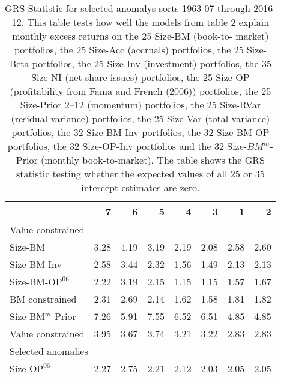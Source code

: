 
\begin{table}[!ht]
\centering
\caption{
\scriptsize{
GRS Statistic for selected anomalys sorts 1963-07 through 2016-12. This table tests how
well the models from table 2 explain monthly excess returns on the 25 Size-BM (book-to-
market) portfolios, the 25 Size-Acc (accruals) portfolios, the 25 Size-Beta portfolios,
the 25 Size-Inv (investment) portfolios, the 35 Size-NI (net share issues) portfolios, the
25 Size-OP (profitability from Fama and French (2006)) portfolios, the 25 Size-Prior 2–12
(momentum) portfolios, the 25 Size-RVar (residual variance) portfolios, the 25 Size-Var
(total variance) portfolios, the 32 Size-BM-Inv portfolios, the 32 Size-BM-OP portfolios,
the 32 Size-OP-Inv portfolios and the 32 Size-$BM^m$-Prior (monthly book-to-market). The
table shows the GRS statistic testing whether the expected values of all 25 or 35
intercept estimates are zero.
}
}
\begin{tabular}{lrrrrrrr}
  \toprule
     & 7 & 6  & 5  & 4  & 3  & 1  & 2  \\
  \midrule
  
    \multicolumn{8}{l}{Value constrained} \\
    
    Size-BM  & 3.28  & 4.19  & 3.19  & 2.19  & 2.08  & 2.58  & 2.60  \\
    
  
    
    
    Size-BM-Inv  & 2.58  & 3.44  & 2.32  & 1.56  & 1.49  & 2.13  & 2.13  \\
    
  
    
    
    Size-BM-$\text{OP}^{06}$  & 2.22  & 3.19  & 2.15  & 1.15  & 1.15  & 1.57  & 1.67  \\
    
  
    
    
    BM constrained  & 2.31  & 2.69  & 2.14  & 1.62  & 1.58  & 1.81  & 1.82  \\
    [1em]
  
    
    
    Size-$\text{BM}^m$-Prior  & 7.26  & 5.91  & 7.55  & 6.52  & 6.51  & 4.85  & 4.85  \\
    
  
    
    
    Value constrained  & 3.95  & 3.67  & 3.74  & 3.21  & 3.22  & 2.83  & 2.83  \\
    [1em]
  
    
    \multicolumn{8}{l}{Selected anomalies} \\
    Size-$\text{OP}^{06}$  & 2.27  & 2.75  & 2.21  & 2.12  & 2.03  & 2.05  & 2.05  \\
    

\end{tabular}
\end{table}
